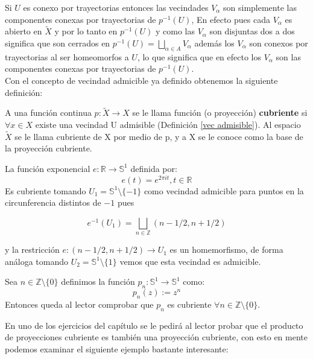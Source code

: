 Si $U$ es conexo por trayectorias entonces las vecindades $V_{\alpha}$ son simplemente las componentes conexas por trayectorias de $p^{-1}(U)$, En efecto pues cada $V_{\alpha}$ es abierto en $\widetilde{X}$ y por lo tanto en $p^{-1}(U)$ y como las $V_{\alpha}$ son disjuntas dos a dos significa que son cerrados en $p^{-1}(U)= \bigsqcup_{\alpha \in A} V_{\alpha}$ adem\'as los $V_{\alpha}$ son conexos por trayectorias al ser homeomorfos a $U$, lo que significa que en efecto los $V_{\alpha}$ son las componentes conexas por trayectorias de $p^{-1}(U)$.\\

Con el concepto de vecindad admicible ya definido obtenemos la siguiente definici\'on:\\

\begin{definition}\label{proy cubr}
A una funci\'on continua $p: \widetilde{X} \rightarrow X$ se le llama funci\'on (o proyecci\'on) \textbf{cubriente} si $\forall x \in X$ existe una vecindad U admisible (Definici\'on \ref{vec admisible}). Al espacio $ \widetilde{X}$ se le llama cubriente de X por medio de p, y a X se le conoce como la base de la proyecci\'on cubriente.
\end{definition}


 \begin{example}
La funci\'on exponencial 
$e:\mathbb R \rightarrow \mathbb S^{1}$ 
definida por:
 $$e(t)= e^{2 \pi i t}, t \in \mathbb R$$ 
Es cubriente  tomando $U_{1}=\mathbb S^{1} \setminus \lbrace -1 \rbrace $ 
como vecindad admicible para puntos en la circunferencia distintos de $-1$ pues 

$$e^{-1}(U_{1})= \bigsqcup_{n \in \mathbb Z}(n-1/2,n+1/2)$$ 

y la restricci\'on $e:(n-1/2,n+1/2) \rightarrow U_{1}$ 
es un homemorfismo, de forma an\'aloga tomando 
$U_{2}=\mathbb S^{1} \setminus \lbrace 1 \rbrace$ vemos que esta vecindad es admicible.\\
\end{example}

\begin{example}
Sea $n \in \mathbb{Z} \setminus \lbrace 0 \rbrace$ definimos la funci\'on $p_n:\mathbb S^{1} \rightarrow \mathbb S^{1}$ como:
$$p_n(z):=z^n$$
Entonces queda al lector comprobar que $p_n$ es cubriente $\forall n \in \mathbb{Z} \setminus \lbrace 0 \rbrace$.\\
\end{example}

En uno de los ejercicios del cap\'itulo se le pedir\'a al lector probar que el producto de proyecciones cubriente es tambi\'en una proyecci\'on cubriente, con esto en mente podemos examinar el siguiente ejemplo bastante interesante:

